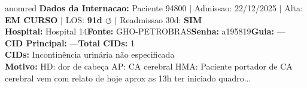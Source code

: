 \documentclass[a4paper,10pt]{article}
\begin{document}
\begin{anomalycard}[Internacao 159824 | GHO-PETROBRAS | CRITICO (z=5.64)]{anomred}
\textbf{Dados da Internacao:} Paciente 94800 $\mid$ Admissao: 22/12/2025 $\mid$ Alta: \textcolor{anomorange}{\textbf{EM CURSO}} $\mid$ LOS: \textbf{91d \textcolor{anomorange}{$\circlearrowleft$}} $\mid$ Readmissao 30d: \textcolor{anomred}{\textbf{SIM}}\\
\textbf{Hospital:} Hospital 14\quad\textbf{Fonte:} GHO-PETROBRAS\quad\textbf{Senha:} a195819\quad\textbf{Guia:} ---\\
\textbf{CID Principal:} {\small ---}\quad\textbf{Total CIDs:} 1\\

\textbf{CIDs:} {\scriptsize Incontinência urinária não especificada}\\

\textbf{Motivo:} {\scriptsize HD: dor de cabeça AP: CA cerebral  HMA: Paciente portador de CA cerebral vem com relato de hoje aprox as 13h ter iniciado quadro...}\\


\end{anomalycard}
\end{document}
